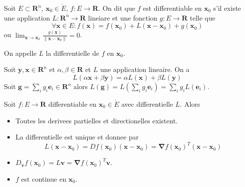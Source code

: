 \begin{definition}
Soit $E\subset \mathbf{R}^{n}$, $\boldsymbol{x}_{0}\in\mathring{E}$, $f:E\to \mathbf{R}$. On dit que $f$ est differentiable en $\boldsymbol{x}_{0}$ s'il existe une application $L:\mathbf{R}^{n}\to \mathbf{R}$ lineiare et une fonction $g:E\to \mathbf{R}$ telle que
$$
\forall \boldsymbol{x}\in E:f(\boldsymbol{x})=f(\boldsymbol{x}_{0})+L(\boldsymbol{x}-\boldsymbol{x}_{0})+g(\boldsymbol{x}_{0})
$$
ou $\lim_{ \boldsymbol{x} \to \boldsymbol{x}_{0} } \frac{g(\boldsymbol{x})}{\lVert \boldsymbol{x}-\boldsymbol{x}_{0} \rVert}=0$.

On appelle $L$ la differentielle de $f$ en $\boldsymbol{x}_{0}$.
\end{definition}
\begin{reminder}
Soit $\boldsymbol{y},\boldsymbol{x}\in \mathbf{R}^{n}$ et $\alpha,\beta \in \mathbf{R}$ et $L$ une application lineaire. On a
$$
L(\alpha \boldsymbol{x}+\beta \boldsymbol{y})=\alpha L(\boldsymbol{x})+\beta L(\boldsymbol{y})
$$
Soit $\boldsymbol{g}=\sum _{i}g_{i}\boldsymbol{e}_{i}\in \mathbf{R}^{n}$ alors $L(\boldsymbol{g})=L\left( \sum _{i}g_{i}\boldsymbol{e}_{i} \right)=\sum _{i} g_{i}L(\boldsymbol{e}_{i})$. 
\end{reminder}

\begin{theorem}
Soit $f:E\to \mathbf{R}$ differentiable en $\boldsymbol{x}_{0}\in\mathring{E}$ avec differentielle $L$. Alors
\begin{itemize}
\item Toutes les derivees partielles et directionelles existent.
\item La differentielle est unique et donnee par 
$$
L(\boldsymbol{x}-\boldsymbol{x}_{0})=Df(\boldsymbol{x}_{0})(\boldsymbol{x}-\boldsymbol{x}_{0})=\boldsymbol{\nabla}f(\boldsymbol{x}_{0})^{T}(\boldsymbol{x}-\boldsymbol{x}_{0})
$$
\item $D_{\boldsymbol{v}}f(\boldsymbol{x}_{0})=L\boldsymbol{v}=\boldsymbol{\nabla}f(\boldsymbol{x}_{0})^{T}\boldsymbol{v}$.
\item $f$ est continue en $\boldsymbol{x}_{0}$.
\end{itemize}
\end{theorem}
